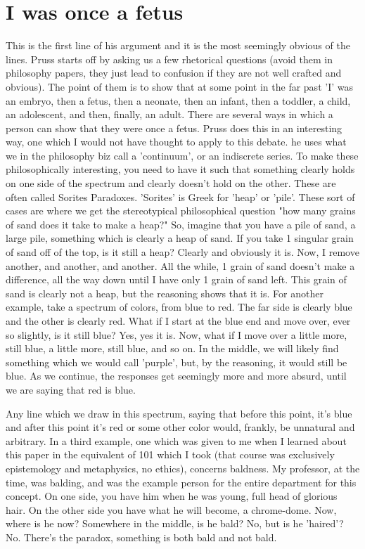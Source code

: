 \section{I was once a fetus}
This is the first line of his argument and it is the most seemingly obvious of the lines. Pruss starts off by asking us a few rhetorical questions (avoid them in philosophy papers, they just lead to confusion if they are not well crafted and obvious). The point of them is to show that at some point in the far past 'I' was an embryo, then a fetus, then a neonate, then an infant, then a toddler, a child, an adolescent, and then, finally, an adult. There are several ways in which a person can show that they were once a fetus. Pruss does this in an interesting way, one which I would not have thought to apply to this debate. he uses what we in the philosophy biz call a 'continuum', or an indiscrete series. To make these philosophically interesting, you need to have it such that something clearly holds on one side of the spectrum and clearly doesn't hold on the other. These are often called Sorites Paradoxes. 'Sorites' is Greek for 'heap' or 'pile'. These sort of cases are where we get the stereotypical philosophical question "how many grains of sand does it take to make a heap?" So, imagine that you have a pile of sand, a large pile, something which is clearly a heap of sand. If you take 1 singular grain of sand off of the top, is it still a heap? Clearly and obviously it is. Now, I remove another, and another, and another. All the while, 1 grain of sand doesn't make a difference, all the way down until I have only 1 grain of sand left. This grain of sand is clearly not a heap, but the reasoning shows that it is. For another example, take a spectrum of colors, from blue to red. The far side is clearly blue and the other is clearly red. What if I start at the blue  end and move over, ever so slightly, is it still blue? Yes, yes it is. Now, what if I move over a little more, still blue, a little more, still blue, and so on. In the middle, we will likely find something which we would call 'purple', but, by the reasoning, it would still be blue. As we continue, the responses get seemingly more and more absurd, until we are saying that red is blue.   

Any line which we draw in this spectrum, saying that before this point, it's blue and after this point it's red or some other color would, frankly, be unnatural and arbitrary. In a third example, one which was given to me when I learned about this paper in the equivalent of 101 which I took (that course was exclusively epistemology and metaphysics, no ethics), concerns baldness. My professor, at the time, was balding, and was the example person for the entire department for this concept. On one side, you have him when he was young, full head of glorious hair. On the other side you have what he will become, a chrome-dome. Now, where is he now? Somewhere in the middle, is he bald? No, but is he 'haired'? No. There's the paradox, something is both bald and not bald. 

